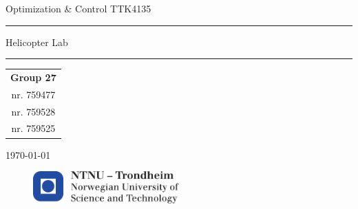 
\begin{titlepage}
    \begin{center}
    	\large
    	Optimization \& Control TTK4135
    \end{center}
    \vspace{\fill}
    \rule{\linewidth}{0.5mm}
    \begin{center}
    	\huge
    	Helicopter Lab
    \end{center}
	\rule{\linewidth}{0.5mm}
	\vspace{\fill}

    \large
    \centering
    \begin{table}[H]
    	\centering
    	\large
    	\begin{tabular}{c}
            \textbf{Group 27}\\
            nr. 759477 \\
    		nr. 759528\\
            nr. 759525
    	\end{tabular}
    \end{table}
    \vspace{\fill}
    \begin{center}
    	\large
    	\today
    \end{center}
	\vspace{\fill}
    \begin{figure}[H]
    \centering
    \includegraphics[width=0.5\textwidth]{logontnu_eng}
    \end{figure}
    \thispagestyle{empty}
\end{titlepage}
